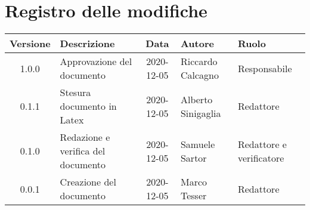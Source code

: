 \section*{Registro delle modifiche}

\begin{center}
	\begin{longtable}{|c|p{3.5cm}|c|p{3cm}|p{3cm}|}
		\hline
		\rowcolor{lighter-grayer}
		\textbf{Versione} & \textbf{Descrizione} & \textbf{Data} & \textbf{Autore} & \textbf{Ruolo} \\
		\hline
		\endfirsthead
		1.0.0 & Approvazione del documento & 2020-12-05 & Riccardo Calcagno & Responsabile \\
		\hline
		0.1.1 & Stesura documento in Latex & 2020-12-05 & Alberto Sinigaglia & Redattore \\
		\hline
		0.1.0 & Redazione e verifica del documento & 2020-12-05 & Samuele Sartor & Redattore e verificatore \\
		\hline
		0.0.1 & Creazione del documento & 2020-12-05 & Marco Tesser & Redattore \\
		\hline

	\end{longtable}
\end{center}
